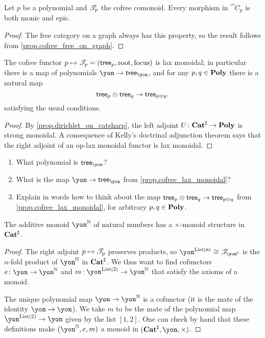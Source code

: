 \documentclass[Book-Poly]{subfiles}
\begin{document}
\begin{corollary}
Let $p$ be a polynomial and $\mathscr{T}_{p}$ the cofree comonoid. Every morphism in $\cat{C}_p$ is both monic and epic.
\end{corollary}
\begin{proof}
The free category on a graph always has this property, so the result follows from \cref{prop.cofree_free_on_graph}.
\end{proof}

\begin{proposition}\label{prop.cofree_lax_monoidal}
The cofree functor $p\mapsto\mathscr{T}_{p}=(\mathsf{tree}_p,\mathrm{root},\mathrm{focus})$ is lax monoidal; in particular there is a map of polynomials $\yon\to\tr_\yon$, and for any $p,q\in\mathbf{Poly}$ there is a natural map
\[
	\mathsf{tree}_p\otimes\mathsf{tree}_q\to\mathsf{tree}_{p\otimes q}.
\]
satisfying the usual conditions.
\end{proposition}
\begin{proof}
By \cref{prop.dirichlet_on_catsharp}, the left adjoint $U\colon\mathbf{Cat}^\sharp\to\mathbf{Poly}$ is strong monoidal. A consequence of Kelly's doctrinal adjunction theorem \cite{kelly1974doctrinal} says that the right adjoint of an op-lax monoidal functor is lax monoidal.
\end{proof}

\begin{exercise}
\begin{enumerate}
	\item What polynomial is $\tr_\yon$?
	\item What is the map $\yon\to\tr_\yon$ from \cref{prop.cofree_lax_monoidal}?
	\item Explain in words how to think about the map $\mathsf{tree}_p\otimes\mathsf{tree}_q\to\mathsf{tree}_{p\otimes q}$ from \cref{prop.cofree_lax_monoidal}, for arbitrary $p,q\in\mathbf{Poly}$.
\qedhere
\end{enumerate}
\end{exercise}

\begin{proposition}\label{prop.ynn_monoid}
The additive monoid $\yon^\nn$ of natural numbers has a $\times$-monoid structure in $\mathbf{Cat}^\sharp$.
\end{proposition}
\begin{proof}
The right adjoint $p\mapsto\mathscr{T}_{p}$ preserves products, so $\yon^{\List(\ord{n})}\cong\cofree{\yon^{\ord{n}}}$ is the $n$-fold product of $\yon^\nn$ in $\mathbf{Cat}^\sharp$. We thus want to find cofunctors $e\colon \yon\to\yon^\nn$ and $m\colon\yon^{\List(\2)}\to\yon^\nn$ that satisfy the axioms of a monoid. 

The unique polynomial map $\yon\to\yon^\nn$ is a cofunctor (it is the mate of the identity $\yon\to\yon$). We take $m$ to be the mate of the polynomial map $\yon^{\List(\2)}\to\yon$ given by the list $[1,2]$. One can check by hand that these definitions make $(\yon^\nn,e,m)$ a monoid in $(\smcat^\sharp,\yon,\times)$.
\end{proof}
\end{document}
